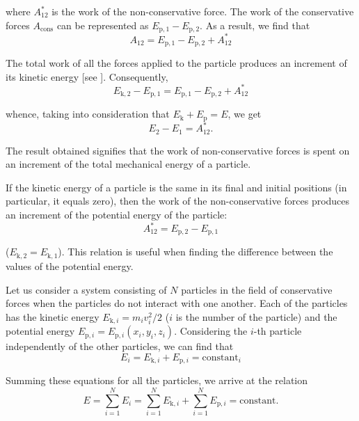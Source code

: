 \noindent
where $A_{12}^*$ is the work of the non-conservative force. The work of the conservative forces $A_{\text{cons}}$ can be represented as $E_{\text{p},1}-E_{\text{p},2}$. As a result, we find that
\begin{equation*}
A_{12} = E_{\text{p},1} - E_{\text{p},2} + A_{12}^*
\end{equation*}

\noindent
The total work of all the forces applied to the particle produces an increment of its kinetic energy [see ]. Consequently,
\begin{equation*}
E_{\text{k},2} - E_{\text{p},1} = E_{\text{p},1} - E_{\text{p},2} + A_{12}^*
\end{equation*}

\noindent
whence, taking into consideration that $E_{\text{k}}+E_{\text{p}}=E$, we get
\begin{equation}\label{eq:3_37}
E_2 - E_1 = A_{12}^*.
\end{equation}

\noindent
The result obtained signifies that the work of non-conservative forces is spent on an increment of the total mechanical energy of a particle.

If the kinetic energy of a particle is the same in its final and initial  positions (in particular, it equals zero), then the work of the non-conservative forces produces an increment of the potential energy of the particle:
\begin{equation}\label{eq:3_38}
A_{12}^* = E_{\text{p},2} - E_{\text{p},1}
\end{equation}

\noindent
($E_{\text{k},2}=E_{\text{k},1}$). This relation is useful when finding the difference between the values of the potential energy.

Let us consider a system consisting of $N$ particles in the field of conservative forces when the particles do not interact with one another. Each of the particles has the kinetic energy $E_{\text{k},i}=m_iv_i^2/2$ ($i$ is the number of the particle) and the potential energy $E_{\text{p},i}=E_{\text{p},i}(x_i,y_i,z_i)$. Considering the $i$-th particle independently of the other particles, we can find that
\begin{equation*}
E_i = E_{\text{k},i} + E_{\text{p},i} = \text{constant}_i
\end{equation*}

\noindent
Summing these equations for all the particles, we arrive at the relation
\begin{equation}\label{eq:3_39}
E = \sum_{i=1}^{N}E_i = \sum_{i=1}^{N}E_{\text{k},i} + \sum_{i=1}^{N}E_{\text{p},i} = \text{constant}.
\end{equation}

